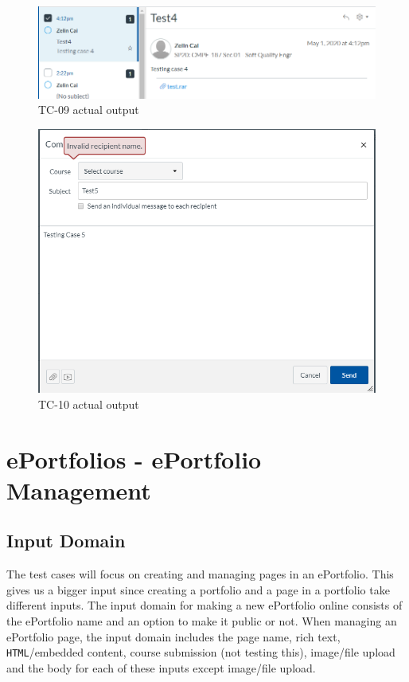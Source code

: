 \documentclass[10pt,letterpaper]{article}
\begin{document}
\begin{figure}[h!]
	\centerline{\includegraphics[width=12cm]{screenshots/tc09-actual-output.png}}
	\caption{TC-09 actual output}
\end{figure}
\begin{figure}[h!]
	\centerline{\includegraphics[width=12cm]{screenshots/tc10-actual-output.png}}
	\caption{TC-10 actual output}
\end{figure}

\newpage
\section{ePortfolios - ePortfolio Management}
\subsection{Input Domain}
The test cases will focus on creating and managing pages in an ePortfolio. This gives us a bigger input since creating a portfolio and a page in a portfolio take different inputs. The input domain for making a new ePortfolio online consists of the ePortfolio name and an option to make it public or not. When managing an ePortfolio page, the input domain includes the page name, rich text, \texttt{HTML}/embedded content, course submission (not testing this), image/file upload and the body for each of these inputs except image/file upload.
\end{document}
